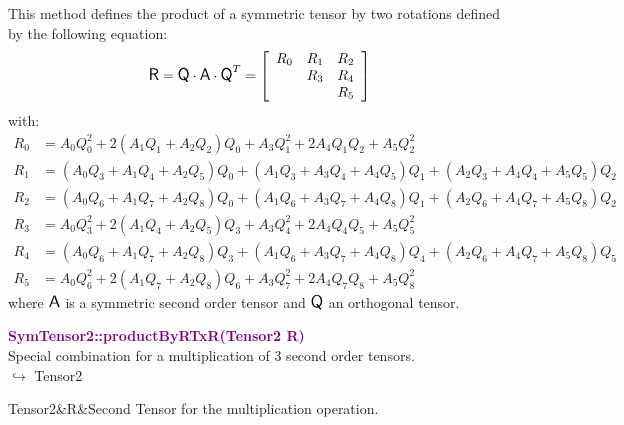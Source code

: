 This method defines the product of a symmetric tensor by two rotations defined by the following equation:
\begin{equation*}
\mbox{\large\ensuremath{\mathsf{R}}} = \mbox{\large\ensuremath{\mathsf{Q}}} \cdot \mbox{\large\ensuremath{\mathsf{A}}} \cdot \mbox{\large\ensuremath{\mathsf{Q}}}^T =\left[\begin{array}{ccc}
R_0&R_1&R_2\\
&R_3&R_4\\
&&R_5
\end{array}\right]
\end{equation*}
with:
\begin{align*}
R_0&=A_0 Q_0^2 + 2 (A_1 Q_1 + A_2 Q_2)Q_0 + A_3 Q_1^2 + 2 A_4 Q_1 Q_2 + A_5 Q_2^2\\
R_1&=(A_0 Q_3 + A_1 Q_4 + A_2 Q_5)Q_0 + (A_1 Q_3 + A_3 Q_4 + A_4 Q_5)Q_1 + (A_2 Q_3 + A_4 Q_4 + A_5 Q_5)Q_2\\
R_2&= (A_0 Q_6 + A_1 Q_7 + A_2 Q_8)Q_0 + (A_1 Q_6 + A_3 Q_7 + A_4 Q_8)Q_1 + (A_2 Q_6 + A_4 Q_7 + A_5 Q_8)Q_2\\
R_3&=A_0 Q_3^2 + 2 (A_1 Q_4 + A_2 Q_5)Q_3+ A_3 Q_4^2 + 2 A_4 Q_4 Q_5 + A_5 Q_5^2\\
R_4&= (A_0 Q_6 + A_1 Q_7 + A_2 Q_8)Q_3 + (A_1 Q_6 + A_3 Q_7 + A_4 Q_8)Q_4 + (A_2 Q_6 + A_4 Q_7 + A_5 Q_8)Q_5\\
R_5&=A_0 Q_6^2 + 2 (A_1 Q_7 + A_2 Q_8)Q_6+ A_3 Q_7^2 + 2 A_4 Q_7 Q_8 + A_5 Q_8^2
\end{align*}
where $\mbox{\large\ensuremath{\mathsf{A}}}$ is a symmetric second order tensor and $\mbox{\large\ensuremath{\mathsf{Q}}}$ an orthogonal tensor.

\textcolor{purple}{\textbf{SymTensor2::productByRTxR(Tensor2 R)}}\label{SymTensor2::productByRTxR(Tensor2 R)}\\
Special combination for a multiplication of 3 second order tensors.\\ \hspace*{10mm}$\hookrightarrow$ Tensor2

\begin{tcolorbox}[width=\textwidth,myArgs,tabularx={ll|R}]
Tensor2&R&Second Tensor for the multiplication operation.
\end{tcolorbox}

